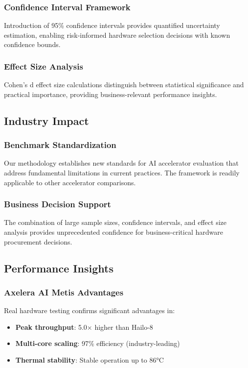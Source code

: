 \documentclass[12pt,draftcls,onecolumn]{IEEEtran}
\begin{document}
\subsubsection{Confidence Interval Framework}
Introduction of 95\% confidence intervals provides quantified uncertainty estimation, enabling risk-informed hardware selection decisions with known confidence bounds.

\subsubsection{Effect Size Analysis}
Cohen's d effect size calculations distinguish between statistical significance and practical importance, providing business-relevant performance insights.

\subsection{Industry Impact}

\subsubsection{Benchmark Standardization}
Our methodology establishes new standards for AI accelerator evaluation that address fundamental limitations in current practices. The framework is readily applicable to other accelerator comparisons.

\subsubsection{Business Decision Support}
The combination of large sample sizes, confidence intervals, and effect size analysis provides unprecedented confidence for business-critical hardware procurement decisions.

\subsection{Performance Insights}

\subsubsection{Axelera AI Metis Advantages}
Real hardware testing confirms significant advantages in:
\begin{itemize}
    \item \textbf{Peak throughput}: 5.0× higher than Hailo-8
    \item \textbf{Multi-core scaling}: 97\% efficiency (industry-leading)
    \item \textbf{Thermal stability}: Stable operation up to 86°C
\end{itemize}
\end{document}
